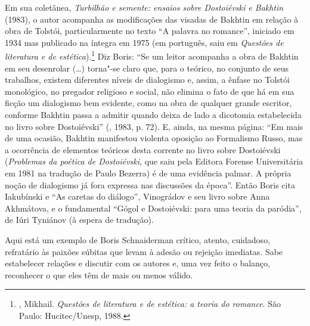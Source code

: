 Em sua coletânea, \emph{Turbilhão e semente: ensaios sobre Dostoiévski e
  Bakhtin} (1983), o autor acompanha as
modificações das visadas de Bakhtin em relação à obra de Tolstói,
particularmente no texto ``A palavra no romance'', iniciado em 1934 mas
publicado na íntegra em 1975 (em português, saiu em \emph{Questões de
literatura e de estética}).\footnote{, Mikhail. \emph{Questões
  de literatura e de estética: a teoria do romance}. São Paulo:
  Hucitec/Unesp, 1988.} Diz Boris: ``Se um leitor acompanha a obra de
Bakhtin em seu desenrolar (\ldots{}) torna"-se claro que, para o teórico, no
conjunto de seus trabalhos, existem diferentes níveis de dialogismo e,
assim, a ênfase no Tolstói monológico, no pregador religioso e social,
não elimina o fato de que há em sua ficção um dialogismo bem evidente,
como na obra de qualquer grande escritor, conforme Bakhtin passa a
admitir quando deixa de lado a dicotomia estabelecida no livro sobre
Dostoiévski'' (, 1983, p. 72). E, ainda, na mesma página:
``Em mais de uma ocasião, Bakhtin manifestou violenta oposição ao
Formalismo Russo, mas a ocorrência de elementos teóricos desta corrente
no livro sobre Dostoiévski (\emph{Problemas da poética de Dostoiévski},
que saiu pela Editora Forense Universitária em 1981 na tradução de Paulo
Bezerra) é de uma evidência palmar. A própria noção de dialogismo já
fora expressa nas discussões da época''. Então Boris cita Iakubínski e
``As caretas do diálogo'', Vinográdov e seu livro sobre Anna Akhmátova,
e o fundamental ``Gógol e Dostoiévski: para uma teoria da paródia'',
de Iúri Tyniánov (à espera de tradução).

Aqui está um exemplo de Boris Schnaiderman crítico, atento, cuidadoso,
refratário às paixões súbitas que levam à adesão ou rejeição imediatas.
Sabe estabelecer relações e discutir com os autores e, uma vez feito o
balanço, reconhecer o que eles têm de mais ou menos válido.

